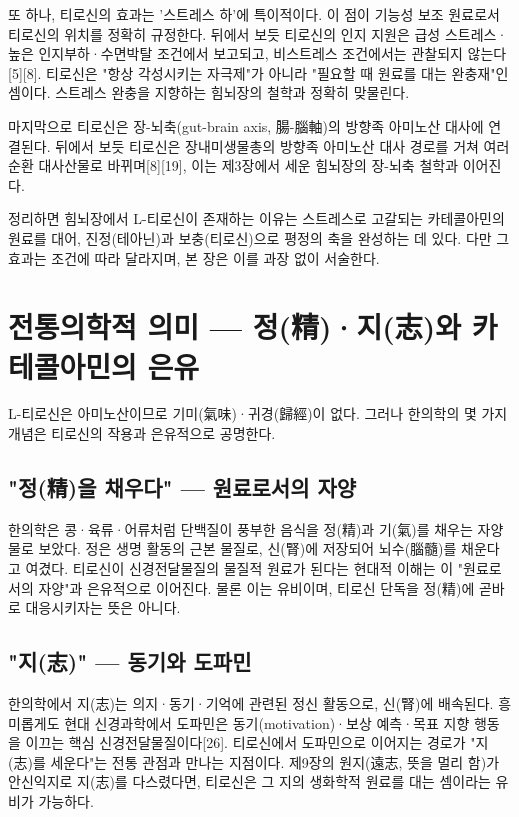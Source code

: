 \documentclass[12pt,oneside]{book}
\begin{document}
또 하나, 티로신의 효과는 '스트레스 하'에 특이적이다. 이 점이 기능성 보조 원료로서 티로신의 위치를 정확히 규정한다. 뒤에서 보듯 티로신의 인지 지원은 급성 스트레스·높은 인지부하·수면박탈 조건에서 보고되고, 비스트레스 조건에서는 관찰되지 않는다[5][8]. 티로신은 "항상 각성시키는 자극제"가 아니라 "필요할 때 원료를 대는 완충재"인 셈이다. 스트레스 완충을 지향하는 힘뇌장의 철학과 정확히 맞물린다.

마지막으로 티로신은 장-뇌축(gut-brain axis, 腸-腦軸)의 방향족 아미노산 대사에 연결된다. 뒤에서 보듯 티로신은 장내미생물총의 방향족 아미노산 대사 경로를 거쳐 여러 순환 대사산물로 바뀌며[8][19], 이는 제3장에서 세운 힘뇌장의 장-뇌축 철학과 이어진다.

정리하면 힘뇌장에서 L-티로신이 존재하는 이유는 스트레스로 고갈되는 카테콜아민의 원료를 대어, 진정(테아닌)과 보충(티로신)으로 평정의 축을 완성하는 데 있다. 다만 그 효과는 조건에 따라 달라지며, 본 장은 이를 과장 없이 서술한다.

\section{전통의학적 의미 — 정(精)·지(志)와 카테콜아민의 은유}

L-티로신은 아미노산이므로 기미(氣味)·귀경(歸經)이 없다. 그러나 한의학의 몇 가지 개념은 티로신의 작용과 은유적으로 공명한다.

\subsection{"정(精)을 채우다" — 원료로서의 자양}

한의학은 콩·육류·어류처럼 단백질이 풍부한 음식을 정(精)과 기(氣)를 채우는 자양물로 보았다. 정은 생명 활동의 근본 물질로, 신(腎)에 저장되어 뇌수(腦髓)를 채운다고 여겼다. 티로신이 신경전달물질의 물질적 원료가 된다는 현대적 이해는 이 "원료로서의 자양"과 은유적으로 이어진다. 물론 이는 유비이며, 티로신 단독을 정(精)에 곧바로 대응시키자는 뜻은 아니다.

\subsection{"지(志)" — 동기와 도파민}

한의학에서 지(志)는 의지·동기·기억에 관련된 정신 활동으로, 신(腎)에 배속된다. 흥미롭게도 현대 신경과학에서 도파민은 동기(motivation)·보상 예측·목표 지향 행동을 이끄는 핵심 신경전달물질이다[26]. 티로신에서 도파민으로 이어지는 경로가 "지(志)를 세운다"는 전통 관점과 만나는 지점이다. 제9장의 원지(遠志, 뜻을 멀리 함)가 안신익지로 지(志)를 다스렸다면, 티로신은 그 지의 생화학적 원료를 대는 셈이라는 유비가 가능하다.
\end{document}
